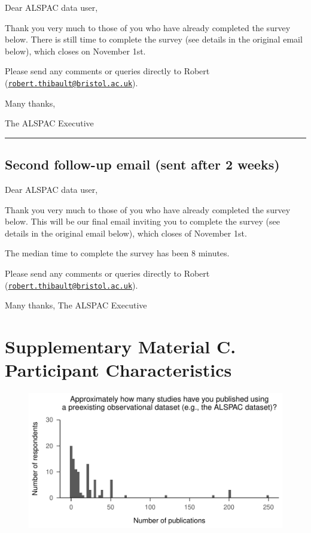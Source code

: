 \documentclass[
  man,floatsintext]{apa6}
\begin{document}
Dear ALSPAC data user,

Thank you very much to those of you who have already completed the survey below.
There is still time to complete the survey (see details in the original email below), which closes on November 1st.

Please send any comments or queries directly to Robert (\href{mailto:robert.thibault@bristol.ac.uk}{\nolinkurl{robert.thibault@bristol.ac.uk}}).

Many thanks,

The ALSPAC Executive

\begin{center}\rule{0.5\linewidth}{0.5pt}\end{center}

\hypertarget{second-follow-up-email-sent-after-2-weeks}{%
\subsection{Second follow-up email (sent after 2 weeks)}\label{second-follow-up-email-sent-after-2-weeks}}

Dear ALSPAC data user,

Thank you very much to those of you who have already completed the survey below.
This will be our final email inviting you to complete the survey (see details in the original email below), which closes of November 1st.

The median time to complete the survey has been 8 minutes.

Please send any comments or queries directly to Robert (\href{mailto:robert.thibault@bristol.ac.uk}{\nolinkurl{robert.thibault@bristol.ac.uk}}).

Many thanks,
The ALSPAC Executive

\pagebreak

\hypertarget{supplementary-material-c.-participant-characteristics}{%
\section{Supplementary Material C. Participant Characteristics}\label{supplementary-material-c.-participant-characteristics}}

\begin{figure}

{\centering \includegraphics[width=1\linewidth]{figs/numStudiesPlot-1} 

}

\caption{ }\label{fig:numStudiesPlot}
\end{figure}
\end{document}
